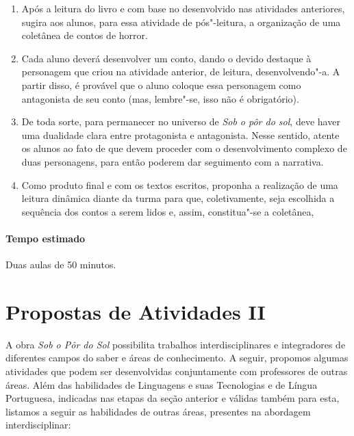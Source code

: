 \documentclass[12pt]{extarticle}
\begin{document}
\begin{enumerate}
\item	
Após a leitura do livro e com base no desenvolvido nas atividades
anteriores, sugira aos alunos, para essa atividade de pós"-leitura, a organização de uma coletânea de contos
de horror. 

\item
Cada aluno deverá desenvolver um conto, dando o devido
destaque à personagem que criou na atividade anterior, de leitura, desenvolvendo"-a. A
partir disso, é provável que o aluno coloque essa personagem como
antagonista de seu conto (mas, lembre"-se, isso não é obrigatório).

\item
De toda sorte, para permanecer no universo de \emph{Sob o pôr do sol}, deve haver
uma dualidade clara entre protagonista e antagonista. Nesse sentido,
atente os alunos ao fato de que devem proceder com o desenvolvimento
complexo de duas personagens, para então poderem dar seguimento com a
narrativa. 

\item
Como produto final e com os textos escritos, proponha a realização de uma
leitura dinâmica diante da turma para que, coletivamente, seja escolhida a sequência dos contos a serem lidos 
e, assim, constitua"-se a coletânea, 

\end{enumerate}

\paragraph{Tempo estimado} Duas aulas de 50 minutos. 


\section{Propostas de Atividades II}

A obra \emph{Sob o Pôr do Sol} possibilita trabalhos interdisciplinares
e integradores de diferentes campos do saber e áreas de conhecimento. A
seguir, propomos algumas atividades que podem ser desenvolvidas
conjuntamente com professores de outras áreas. Além das habilidades de
Linguagens e suas Tecnologias e de Língua Portuguesa, indicadas nas
etapas da seção anterior e válidas também para esta, listamos a seguir
as habilidades de outras áreas, presentes na abordagem interdisciplinar:

\end{document}

